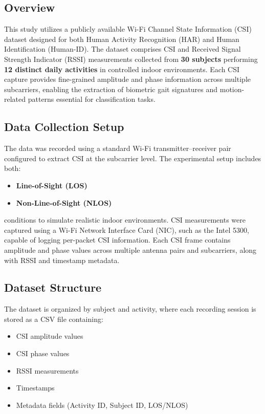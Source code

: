 \subsection{Overview}
This study utilizes a publicly available Wi-Fi Channel State Information (CSI) dataset designed for both Human Activity Recognition (HAR) and Human Identification (Human-ID). The dataset  comprises CSI and Received Signal Strength Indicator (RSSI) measurements collected from \textbf{30 subjects} performing \textbf{12 distinct daily activities} in controlled indoor environments. Each CSI capture provides fine-grained amplitude and phase information across multiple subcarriers, enabling the extraction of biometric gait signatures and motion-related patterns essential for classification tasks\parencite{alsaify2020losnlos}.





\subsection{Data Collection Setup}
The data was recorded using a standard Wi-Fi transmitter--receiver pair configured to extract CSI at the subcarrier level. The experimental setup includes both:
\begin{itemize}
    \item \textbf{Line-of-Sight (LOS)}
    \item \textbf{Non-Line-of-Sight (NLOS)}
\end{itemize}
conditions to simulate realistic indoor environments. CSI measurements were captured using a Wi-Fi Network Interface Card (NIC), such as the Intel 5300, capable of logging per-packet CSI information. Each CSI frame contains amplitude and phase values across multiple antenna pairs and subcarriers, along with RSSI and timestamp metadata\parencite{alsaify2020losnlos}.

\subsection{Dataset Structure}
The dataset is organized by subject and activity, where each recording session is stored as a CSV file containing:
\begin{itemize}
    \item CSI amplitude values
    \item CSI phase values
    \item RSSI measurements
    \item Timestamps
    \item Metadata fields (Activity ID, Subject ID, LOS/NLOS)
\end{itemize}

